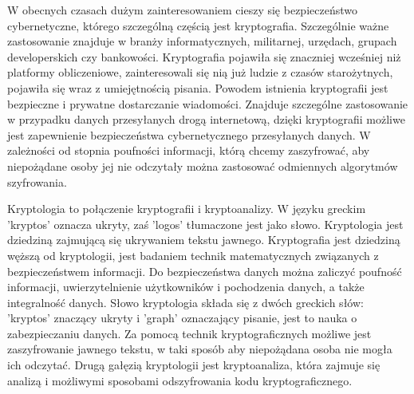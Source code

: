 \documentclass[12p]{article}
\begin{document}
\quad W obecnych czasach dużym zainteresowaniem cieszy się bezpieczeństwo cybernetyczne, którego szczególną częścią jest kryptografia. Szczególnie ważne zastosowanie znajduje w branży informatycznych, militarnej, urzędach, grupach developerskich czy bankowości. Kryptografia pojawiła się znaczniej wcześniej niż platformy obliczeniowe, zainteresowali się nią już ludzie z czasów starożytnych, pojawiła się wraz z umiejętnością pisania. Powodem istnienia kryptografii jest bezpieczne i prywatne dostarczanie wiadomości. Znajduje szczególne zastosowanie w przypadku danych przesyłanych drogą internetową, dzięki kryptografii możliwe jest zapewnienie bezpieczeństwa cybernetycznego przesyłanych danych. W zależności od stopnia poufności informacji, którą chcemy zaszyfrować, aby niepożądane osoby jej nie odczytały można zastosować odmiennych algorytmów szyfrowania. 

\quad Kryptologia to połączenie kryptografii i kryptoanalizy. W języku greckim 'kryptos' oznacza ukryty, zaś 'logos' tłumaczone jest jako słowo. Kryptologia jest dziedziną zajmującą się ukrywaniem tekstu jawnego. Kryptografia jest dziedziną węższą od kryptologii, jest badaniem technik matematycznych związanych z bezpieczeństwem informacji. Do bezpieczeństwa danych można zaliczyć poufność informacji, uwierzytelnienie użytkowników i pochodzenia danych, a także integralność danych. Słowo kryptologia składa się z dwóch greckich słów: 'kryptos' znaczący ukryty i 'graph' oznaczający pisanie, jest to nauka o zabezpieczaniu danych. Za pomocą technik kryptograficznych możliwe jest zaszyfrowanie jawnego tekstu, w taki sposób aby niepożądana osoba nie mogła ich odczytać. Drugą gałęzią kryptologii jest kryptoanaliza, która zajmuje się analizą i możliwymi sposobami odszyfrowania kodu kryptograficznego.
\end{document}
